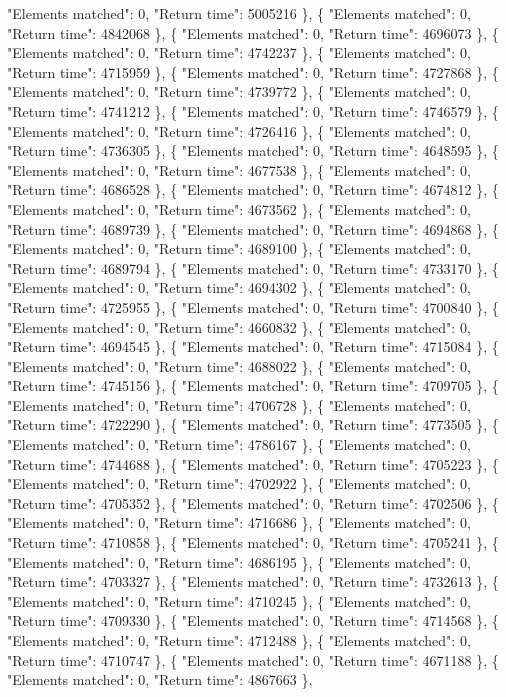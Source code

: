 "Elements matched": 0, "Return time": 5005216 \}, \{ "Elements matched": 0, "Return time": 4842068 \}, \{ "Elements matched": 0, "Return time": 4696073 \}, \{ "Elements matched": 0, "Return time": 4742237 \}, \{ "Elements matched": 0, "Return time": 4715959 \}, \{ "Elements matched": 0, "Return time": 4727868 \}, \{ "Elements matched": 0, "Return time": 4739772 \}, \{ "Elements matched": 0, "Return time": 4741212 \}, \{ "Elements matched": 0, "Return time": 4746579 \}, \{ "Elements matched": 0, "Return time": 4726416 \}, \{ "Elements matched": 0, "Return time": 4736305 \}, \{ "Elements matched": 0, "Return time": 4648595 \}, \{ "Elements matched": 0, "Return time": 4677538 \}, \{ "Elements matched": 0, "Return time": 4686528 \}, \{ "Elements matched": 0, "Return time": 4674812 \}, \{ "Elements matched": 0, "Return time": 4673562 \}, \{ "Elements matched": 0, "Return time": 4689739 \}, \{ "Elements matched": 0, "Return time": 4694868 \}, \{ "Elements matched": 0, "Return time": 4689100 \}, \{ "Elements matched": 0, "Return time": 4689794 \}, \{ "Elements matched": 0, "Return time": 4733170 \}, \{ "Elements matched": 0, "Return time": 4694302 \}, \{ "Elements matched": 0, "Return time": 4725955 \}, \{ "Elements matched": 0, "Return time": 4700840 \}, \{ "Elements matched": 0, "Return time": 4660832 \}, \{ "Elements matched": 0, "Return time": 4694545 \}, \{ "Elements matched": 0, "Return time": 4715084 \}, \{ "Elements matched": 0, "Return time": 4688022 \}, \{ "Elements matched": 0, "Return time": 4745156 \}, \{ "Elements matched": 0, "Return time": 4709705 \}, \{ "Elements matched": 0, "Return time": 4706728 \}, \{ "Elements matched": 0, "Return time": 4722290 \}, \{ "Elements matched": 0, "Return time": 4773505 \}, \{ "Elements matched": 0, "Return time": 4786167 \}, \{ "Elements matched": 0, "Return time": 4744688 \}, \{ "Elements matched": 0, "Return time": 4705223 \}, \{ "Elements matched": 0, "Return time": 4702922 \}, \{ "Elements matched": 0, "Return time": 4705352 \}, \{ "Elements matched": 0, "Return time": 4702506 \}, \{ "Elements matched": 0, "Return time": 4716686 \}, \{ "Elements matched": 0, "Return time": 4710858 \}, \{ "Elements matched": 0, "Return time": 4705241 \}, \{ "Elements matched": 0, "Return time": 4686195 \}, \{ "Elements matched": 0, "Return time": 4703327 \}, \{ "Elements matched": 0, "Return time": 4732613 \}, \{ "Elements matched": 0, "Return time": 4710245 \}, \{ "Elements matched": 0, "Return time": 4709330 \}, \{ "Elements matched": 0, "Return time": 4714568 \}, \{ "Elements matched": 0, "Return time": 4712488 \}, \{ "Elements matched": 0, "Return time": 4710747 \}, \{ "Elements matched": 0, "Return time": 4671188 \}, \{ "Elements matched": 0, "Return time": 4867663 \},

